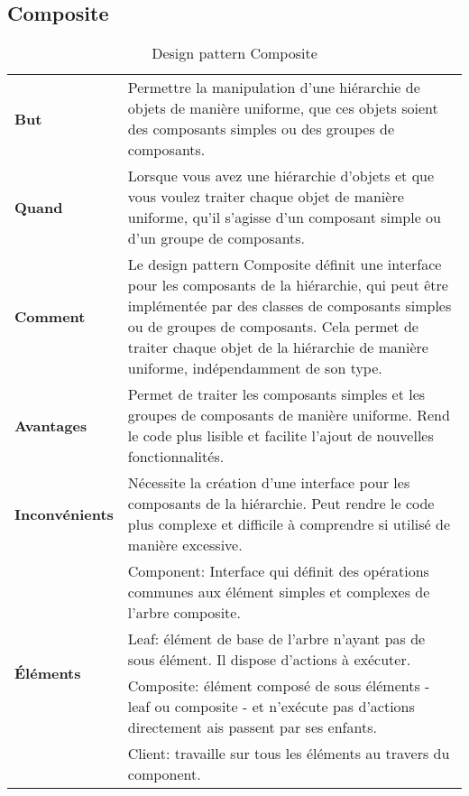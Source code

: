 \subsection{Composite}\label{subsec:composite}
\begin{table}[H]
\caption{Design pattern Composite}
\label{tbl:design_patterns_composite}
\begin{adjustbox}{max width=\textwidth}
\begin{tabular}{l|p{\textwidth}}
\toprule
\textbf{But} & Permettre la manipulation d'une hiérarchie de objets de manière uniforme, que ces objets soient des composants simples ou des groupes de composants.\\
\cmidrule(lr){1-2}
\textbf{Quand} & Lorsque vous avez une hiérarchie d'objets et que vous voulez traiter chaque objet de manière uniforme, qu'il s'agisse d'un composant simple ou d'un groupe de composants.\\
\cmidrule(lr){1-2}
\textbf{Comment} & Le design pattern Composite définit une interface pour les composants de la hiérarchie, qui peut être implémentée par des classes de composants simples ou de groupes de composants. Cela permet de traiter chaque objet de la hiérarchie de manière uniforme, indépendamment de son type.\\
\cmidrule(lr){1-2}
\textbf{Avantages} & Permet de traiter les composants simples et les groupes de composants de manière uniforme. Rend le code plus lisible et facilite l'ajout de nouvelles fonctionnalités.\\
\cmidrule(lr){1-2}
\textbf{Inconvénients} & Nécessite la création d'une interface pour les composants de la hiérarchie. Peut rendre le code plus complexe et difficile à comprendre si utilisé de manière excessive.\\
\cmidrule(lr){1-2}
\multirow{4}{*}{\textbf{\'El\'ements}} & Component: Interface qui d\'efinit des op\'erations communes aux \'el\'ement simples et complexes de l'arbre composite. \\
& Leaf: \'el\'ement de base de l'arbre n'ayant pas de sous \'el\'ement. Il dispose d'actions à ex\'ecuter. \\
& Composite: \'el\'ement compos\'e de sous \'el\'ements - leaf ou composite - et n'ex\'ecute pas d'actions directement ais passent par ses enfants.  \\
& Client: travaille sur tous les \'el\'ements au travers du component. \\

\end{tabular}
\end{adjustbox}
\end{table}

